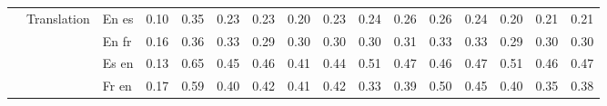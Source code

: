 \begin{center}
\begin{longtable}{lllrrrrrrrrrrrrr}
\cline{2-16}
 & \multirow[t]{4}{*}{Translation} & En es & 0.10 & 0.35 & 0.23 & 0.23 & 0.20 & 0.23 & 0.24 & 0.26 & 0.26 & 0.24 & 0.20 & 0.21 & 0.21 \\
 &  & En fr & 0.16 & 0.36 & 0.33 & 0.29 & 0.30 & 0.30 & 0.30 & 0.31 & 0.33 & 0.33 & 0.29 & 0.30 & 0.30 \\
 &  & Es en & 0.13 & 0.65 & 0.45 & 0.46 & 0.41 & 0.44 & 0.51 & 0.47 & 0.46 & 0.47 & 0.51 & 0.46 & 0.47 \\
 &  & Fr en & 0.17 & 0.59 & 0.40 & 0.42 & 0.41 & 0.42 & 0.33 & 0.39 & 0.50 & 0.45 & 0.40 & 0.35 & 0.38 \\
\cline{1-16} \cline{2-16}
\bottomrule
\end{longtable}

\end{center}
\twocolumn